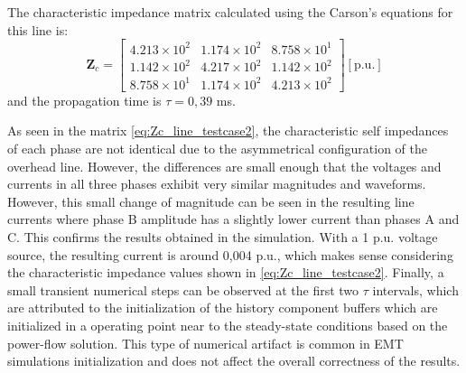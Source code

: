 The characteristic impedance matrix calculated using the Carson's equations for this line is:
\begin{equation}
\mathbf{Z}_c =
\begin{bmatrix}
4.213 \times 10^{2} & 1.174 \times 10^{2} & 8.758 \times 10^{1} \\
1.142 \times 10^{2} & 4.217 \times 10^{2} & 1.142 \times 10^{2} \\
8.758 \times 10^{1} & 1.174 \times 10^{2} & 4.213 \times 10^{2}
\end{bmatrix}
[\text{p.u.}]
\label{eq:Zc_line_testcase2}
\end{equation}
and the propagation time is $\tau = 0,39$ ms. 

As seen in the matrix \ref{eq:Zc_line_testcase2}, the characteristic self impedances of each phase
are not identical due to the asymmetrical configuration of the overhead line. However, the differences are small enough that
the voltages and currents in all three phases exhibit very similar magnitudes and waveforms. However, this small change of magnitude can be seen in the 
resulting line currents where phase B amplitude has a slightly lower current than phases A and C.
This confirms the results obtained in the simulation. With a 1 p.u. voltage source, the resulting current is around 0,004 p.u., which makes sense 
considering the characteristic impedance values shown in \ref{eq:Zc_line_testcase2}.
Finally, a small transient numerical steps can be observed at the first two $\tau$ intervals, 
which are attributed to the initialization of the history component buffers which are initialized in a operating point near 
to the steady-state conditions based on the power-flow solution. 
This type of numerical artifact is common in EMT simulations initialization and does not affect the overall correctness of the results.



